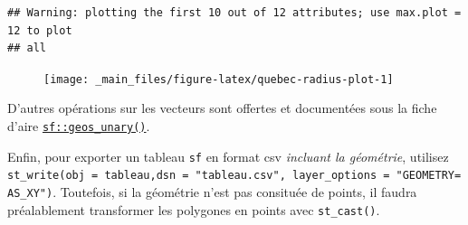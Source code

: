 \documentclass[]{book}
\newenvironment{Shaded}{\begin{snugshade}}{\end{snugshade}}
\newcommand{\CommentTok}[1]{\textcolor[rgb]{0.56,0.35,0.01}{\textit{#1}}}
\newcommand{\DataTypeTok}[1]{\textcolor[rgb]{0.13,0.29,0.53}{#1}}
\newcommand{\DecValTok}[1]{\textcolor[rgb]{0.00,0.00,0.81}{#1}}
\newcommand{\KeywordTok}[1]{\textcolor[rgb]{0.13,0.29,0.53}{\textbf{#1}}}
\newcommand{\NormalTok}[1]{#1}
\newcommand{\OperatorTok}[1]{\textcolor[rgb]{0.81,0.36,0.00}{\textbf{#1}}}
\newcommand{\StringTok}[1]{\textcolor[rgb]{0.31,0.60,0.02}{#1}}
\begin{document}
\begin{Shaded}
\end{Shaded}

\begin{verbatim}
## Warning: plotting the first 10 out of 12 attributes; use max.plot = 12 to plot
## all
\end{verbatim}

\begin{figure}

{\centering \texttt{[image: \_main\_files/figure-latex/quebec-radius-plot-1]} 

}

\caption{ }\label{fig:quebec-radius-plot}
\end{figure}

D'autres opérations sur les vecteurs sont offertes et documentées sous
la fiche d'aire
\href{https://r-spatial.github.io/sf/reference/geos_unary.html}{\texttt{sf::geos\_unary()}}.

Enfin, pour exporter un tableau \texttt{sf} en format csv \emph{incluant
la géométrie}, utilisez
\texttt{st\_write(obj\ =\ tableau,dsn\ =\ "tableau.csv",\ layer\_options\ =\ "GEOMETRY=AS\_XY")}.
Toutefois, si la géométrie n'est pas consituée de points, il faudra
préalablement transformer les polygones en points avec
\texttt{st\_cast()}.

\begin{Shaded}
\end{Shaded}
\end{document}
